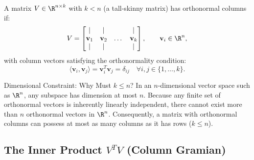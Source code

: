 \begin{definition}
A matrix $V \in \R^{n \times k}$ with $k < n$ (a tall-skinny matrix) has orthonormal columns if:
\begin{equation}
    V = \begin{bmatrix} \mid & \mid & & \mid \\ \mathbf{v}_1 & \mathbf{v}_2 & \dots & \mathbf{v}_k \\ \mid & \mid & & \mid \end{bmatrix}, \qquad \mathbf{v}_i \in \R^n,
\end{equation}
with column vectors satisfying the orthonormality condition:
\begin{equation}
    \langle \mathbf{v}_i, \mathbf{v}_j \rangle = \mathbf{v}_i^T \mathbf{v}_j = \delta_{ij} \quad \forall i, j \in \{1, \dots, k\}.
\end{equation}
\end{definition}

\begin{alertblock}{Dimensional Constraint: Why Must $k \le n$?}
In an $n$-dimensional vector space such as $\R^n$, any subspace has dimension at most $n$. Because any finite set of orthonormal vectors is inherently linearly independent, there cannot exist more than $n$ orthonormal vectors in $\R^n$. Consequently, a matrix with orthonormal columns can possess at most as many columns as it has rows ($k \le n$).
\end{alertblock}

\subsection{The Inner Product \texorpdfstring{$V^T V$}{V\textasciicircum T V} (Column Gramian)}

